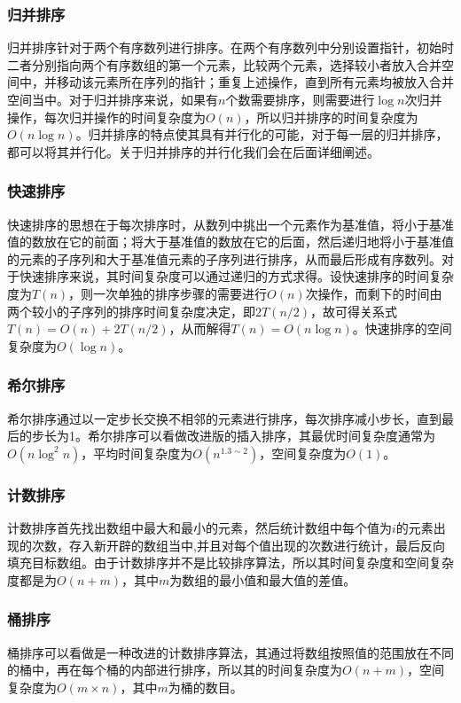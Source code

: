 \subsubsection{归并排序}
    归并排序针对于两个有序数列进行排序。在两个有序数列中分别设置指针，初始时二者分别指向两个有序数组的第一个元素，比较两个元素，选择较小者放入合并空间中，并移动该元素所在序列的指针；重复上述操作，直到所有元素均被放入合并空间当中。对于归并排序来说，如果有$n$个数需要排序，则需要进行$\log n$次归并操作，每次归并操作的时间复杂度为$O(n)$，所以归并排序的时间复杂度为$O(n\log n)$。归并排序的特点使其具有并行化的可能，对于每一层的归并排序，都可以将其并行化。关于归并排序的并行化我们会在后面详细阐述。

\subsubsection{快速排序}
    快速排序的思想在于每次排序时，从数列中挑出一个元素作为基准值，将小于基准值的数放在它的前面；将大于基准值的数放在它的后面，然后递归地将小于基准值的元素的子序列和大于基准值元素的子序列进行排序，从而最后形成有序数列。对于快速排序来说，其时间复杂度可以通过递归的方式求得。设快速排序的时间复杂度为$T(n)$，则一次单独的排序步骤的需要进行$O(n)$次操作，而剩下的时间由两个较小的子序列的排序时间复杂度决定，即$2T(n/2)$，故可得关系式$T(n)=O(n)+2T(n/2)$，从而解得$T(n)=O(n\log n)$。快速排序的空间复杂度为$O(\log n)$。

\subsubsection{希尔排序}
    希尔排序通过以一定步长交换不相邻的元素进行排序，每次排序减小步长，直到最后的步长为1。希尔排序可以看做改进版的插入排序，其最优时间复杂度通常为$O(n\log^2n)$，平均时间复杂度为$O(n^{1.3\sim 2})$，空间复杂度为$O(1)$。

\subsubsection{计数排序}
    计数排序首先找出数组中最大和最小的元素，然后统计数组中每个值为$i$的元素出现的次数，存入新开辟的数组当中,并且对每个值出现的次数进行统计，最后反向填充目标数组。由于计数排序并不是比较排序算法，所以其时间复杂度和空间复杂度都是为$O(n+m)$，其中$m$为数组的最小值和最大值的差值。

\subsubsection{桶排序}
    桶排序可以看做是一种改进的计数排序算法，其通过将数组按照值的范围放在不同的桶中，再在每个桶的内部进行排序，所以其的时间复杂度为$O(n+m)$，空间复杂度为$O(m\times n)$，其中$m$为桶的数目。

